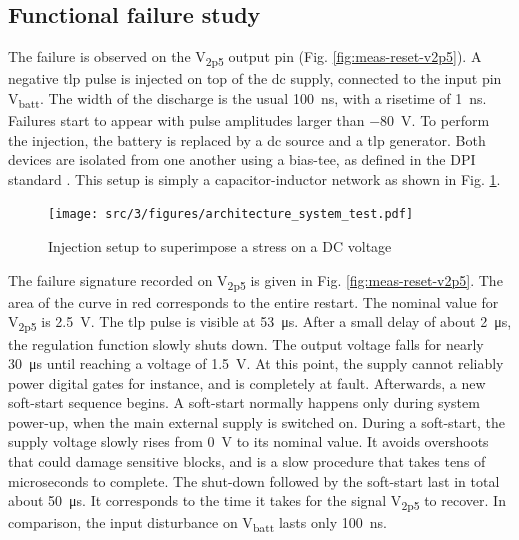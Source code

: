 \subsection{Functional failure study}
\label{sec:failure-case-study}

The failure is observed on the V\textsubscript{2p5} output pin (Fig. \ref{fig:meas-reset-v2p5}).
A negative \gls{tlp} pulse is injected on top of the \gls{dc} supply, connected to the input pin V\textsubscript{batt}.
The width of the discharge is the usual \SI{100}{\nano\second}, with a risetime of \SI{1}{\nano\second}.
Failures start to appear with pulse amplitudes larger than \SI{-80}{\volt}.
To perform the injection, the battery is replaced by a \gls{dc} source and a \gls{tlp} generator.
Both devices are isolated from one another using a \gls{bias-tee}, as defined in the DPI standard \cite{iec62132-4}.
This setup is simply a capacitor-inductor network as shown in Fig. \ref{fig:injection-setup-dpi}.

\begin{figure}[!h]
  \centering
  \texttt{[image: src/3/figures/architecture\_system\_test.pdf]}
  \caption{Injection setup to superimpose a stress on a DC voltage}
  \label{fig:injection-setup-dpi}
\end{figure}

The failure signature recorded on V\textsubscript{2p5} is given in Fig. \ref{fig:meas-reset-v2p5}.
The area of the curve in red corresponds to the entire restart.
The nominal value for V\textsubscript{2p5} is \SI{2.5}{\volt}.
The \gls{tlp} pulse is visible at \SI{53}{\micro\second}.
After a small delay of about \SI{2}{\micro\second}, the regulation function slowly shuts down.
The output voltage falls for nearly \SI{30}{\micro\second} until reaching a voltage of \SI{1.5}{\volt}.
At this point, the supply cannot reliably power digital gates for instance, and is completely at fault.
Afterwards, a new soft-start sequence begins.
A soft-start normally happens only during system power-up, when the main external supply is switched on.
During a soft-start, the supply voltage slowly rises from \SI{0}{\volt} to its nominal value.
It avoids overshoots that could damage sensitive blocks, and is a slow procedure that takes tens of microseconds to complete.
The shut-down followed by the soft-start last in total about \SI{50}{\micro\second}.
It corresponds to the time it takes for the signal V\textsubscript{2p5} to recover.
In comparison, the input disturbance on V\textsubscript{batt} lasts only \SI{100}{\nano\second}.

